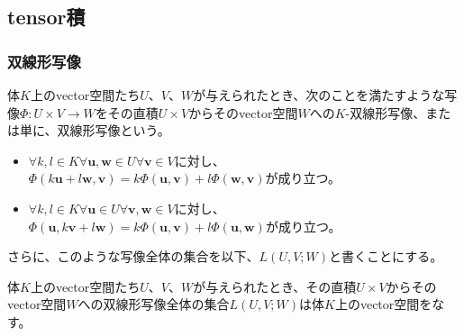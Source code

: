 \documentclass[dvipdfmx]{jsarticle}
\begin{document}
\subsection{tensor積}%
\subsubsection{双線形写像}%
\begin{axs}
体$K$上のvector空間たち$U$、$V$、$W$が与えられたとき、次のことを満たすような写像$\varPhi:U \times V \rightarrow W$をその直積$U \times V$からそのvector空間$W$への$K$-双線形写像、または単に、双線形写像という。
\begin{itemize}
\item
  $\forall k,l \in K\forall\mathbf{u},\mathbf{w} \in U\forall\mathbf{v} \in V$に対し、$\varPhi\left( k\mathbf{u} + l\mathbf{w},\mathbf{v} \right) = k\varPhi\left( \mathbf{u},\mathbf{v} \right) + l\varPhi\left( \mathbf{w},\mathbf{v} \right)$が成り立つ。
\item
  $\forall k,l \in K\forall\mathbf{u} \in U\forall\mathbf{v},\mathbf{w} \in V$に対し、$\varPhi\left( \mathbf{u},k\mathbf{v} + l\mathbf{w} \right) = k\varPhi\left( \mathbf{u},\mathbf{v} \right) + l\varPhi\left( \mathbf{u},\mathbf{w} \right)$が成り立つ。
\end{itemize}
さらに、このような写像全体の集合を以下、$L(U,V;W)$と書くことにする。
\end{axs}
\begin{thm}\label{2.4.5.1}
体$K$上のvector空間たち$U$、$V$、$W$が与えられたとき、その直積$U \times V$からそのvector空間$W$への双線形写像全体の集合$L(U,V;W)$は体$K$上のvector空間をなす。
\end{thm}
\end{document}
